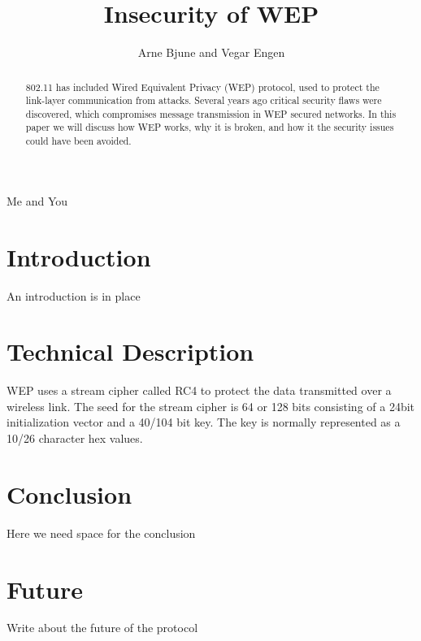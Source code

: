 \documentclass[twocolumn]{IEEEtran}
\begin{document}
\title{Insecurity of WEP}


\author{Arne Bjune and Vegar Engen}

{Me and You}

\maketitle

\begin{abstract}
802.11 has included Wired Equivalent Privacy (WEP) protocol, used to protect the 
link-layer communication from attacks. Several years ago critical 
security flaws were discovered, which compromises message transmission in WEP secured networks. 
In this paper we will discuss how WEP works, why it is broken, and how it the security issues
could have been avoided.
\end{abstract}

\section {Introduction}
\label{sec:introduction}

An introduction is in place




\section {Technical Description}
\label{sec:technical_description}

WEP uses a stream cipher called RC4 to protect the data transmitted over a wireless link. The seed for the stream cipher is 64 or 128 bits consisting of a 24bit initialization vector and a 40/104 bit key. The key is normally represented as a 10/26 character hex values.




\section {Conclusion}
\label{sec:conclusion}

Here we need space for the conclusion



\section {Future}
\label{sec:future}

Write about the future of the protocol






\end{document}

